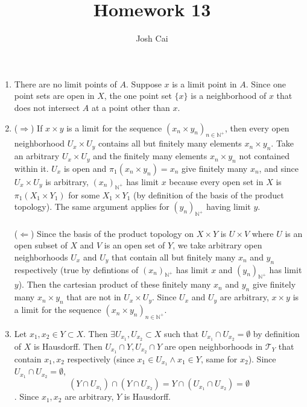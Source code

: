 \documentclass{article}
\begin{document}
\title{Homework 13}
\author{Josh Cai}

\maketitle
\begin{enumerate}
\item
There are no limit points of $A$. Suppose $x$ is a limit point in $A$. Since one point sets are open in $X$, the one point set $\{x\}$ is a neighborhood of $x$ that does not intersect $A$ at a point other than $x$.

\item
($\Rightarrow$) If $x \times y$ is a limit for the sequence $(x_n \times y_n)_{n\in \mathbb{N}^+}$, then every open neighborhood $U_x \times U_y$ contains all but finitely many elements $x_n \times y_n$. Take an arbitrary $U_x \times U_y$ and the finitely many elements $x_n \times y_n$ not contained within it. $U_x$ is open and $\pi_1(x_n \times y_n) = x_n$ give finitely many $x_n$, and since $U_x \times U_y$ is arbitrary, $(x_n)_{\mathbb{N}^+}$ has limit $x$ because every open set in $X$ is $\pi_1(X_1 \times Y_1)$ for some $X_1 \times Y_1$ (by definition of the basis of the product topology). The same argument applies for $(y_n)_{\mathbb{N}^+}$ having limit $y$.
\\\\
($\Leftarrow$) Since the basis of the product topology on $X \times Y$ is $U \times V$ where $U$ is an open subset of $X$ and $V$ is an open set of $Y$, we take arbitrary open neighborhoods $U_x$ and $U_y$ that contain all but finitely many $x_n$ and $y_n$ respectively (true by defintions of $(x_n)_{\mathbb{N}^+}$ has limit $x$ and $(y_n)_{\mathbb{N}^+}$ has limit $y$). Then the cartesian product of these finitely many $x_n$ and $y_n$ give finitely many $x_n \times y_n$ that are not in $U_x \times U_y$. Since $U_x$ and $U_y$ are arbitrary, $x \times y$ is a limit for the sequence $(x_n \times y_n)_{n\in \mathbb{N}^+}$. 

\item
Let $x_1, x_2 \in Y \subset X$. Then $\exists U_{x_1}, U_{x_2} \subset X$ such that $U_{x_1} \cap U_{x_2} = \emptyset$ by definition of $X$ is Hausdorff. Then $U_{x_1} \cap Y, U_{x_2} \cap Y$ are open neighborhoods in $\mathcal{T}_Y$ that contain $x_1, x_2$ respectively (since $x_1 \in U_{x_1} \wedge x_1 \in Y$, same for $x_2$). Since $U_{x_1} \cap U_{x_2} = \emptyset$, 
\[(Y \cap U_{x_1}) \cap (Y \cap U_{x_2}) = Y \cap (U_{x_1} \cap U_{x_2}) = \emptyset\]. Since $x_1, x_2$ are arbitrary, $Y$ is Hausdorff. 


\end{enumerate}
\end{document}

